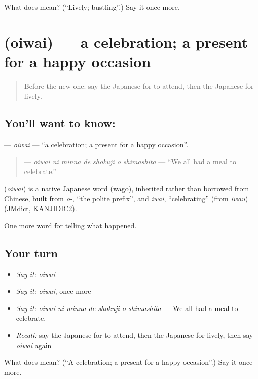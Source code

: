 \begin{tcolorbox}[breakable,colback=teal!4,colframe=teal!35!black,title={Before you move on}]
What does  mean? (\textquotedblleft{}Lively; bustling\textquotedblright{}.) Say it once more.
\end{tcolorbox}
\section[\texorpdfstring{\ja{おいわい} (oiwai)}{おいわい (oiwai)}]{ (oiwai) — a celebration; a present for a happy occasion}

\label{lesson:JA-C288-oiwai}



\begin{quote}
Before the new one: say the Japanese for to attend, then the Japanese for lively.
\end{quote}

\subsection*{You'll want to know: }
\textbf{} — \emph{oiwai} — \textquotedblleft{}a celebration; a present for a happy occasion\textquotedblright{}.

\begin{quote}
\textbf{   } — \emph{oiwai ni minna de shokuji o shimashita} — \textquotedblleft{}We all had a meal to celebrate.\textquotedblright{}
\end{quote}

\begin{cousinweb}
\textbf{} (\emph{oiwai}) is a native Japanese word (wago), inherited rather than borrowed from Chinese, built from \emph{o-}, \textquotedblleft{}the polite prefix\textquotedblright{}, and \emph{iwai}, \textquotedblleft{}celebrating\textquotedblright{} (from \emph{iwau}) (JMdict, KANJIDIC2).
\end{cousinweb}

\begin{grammarlens}[title={What you've built}]
One more word for telling what happened.
\end{grammarlens}

\subsection*{Your turn}
\begin{itemize}
\raggedright
  \item \emph{Say it:} \emph{oiwai}
  \item \emph{Say it:} \emph{oiwai}, once more
  \item \emph{Say it:} \emph{oiwai ni minna de shokuji o shimashita} — We all had a meal to celebrate.
  \item \emph{Recall:} say the Japanese for to attend, then the Japanese for lively, then say \emph{oiwai} again
\end{itemize}

\begin{tcolorbox}[breakable,colback=teal!4,colframe=teal!35!black,title={Before you move on}]
What does  mean? (\textquotedblleft{}A celebration; a present for a happy occasion\textquotedblright{}.) Say it once more.
\end{tcolorbox}
